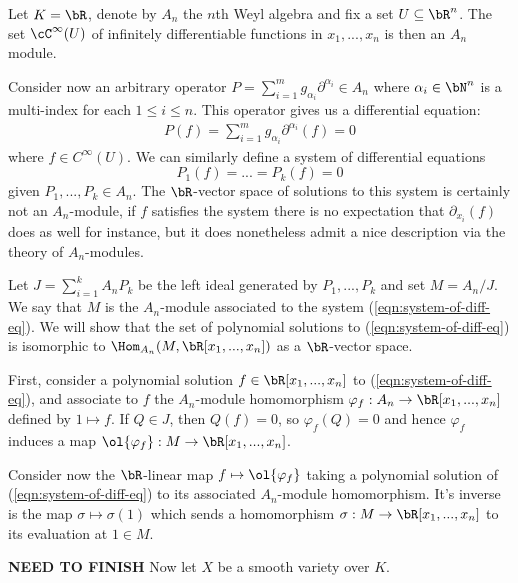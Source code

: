 \begin{example}\label{example:differential-equation}
	Let $K = \bR$, denote by $A_n$ the $n$th Weyl algebra and fix a set $U \subseteq \bR^n$. The set $\cC^\infty(U)$ of infinitely differentiable functions in $x_1,...,x_n$ is then an $A_n$ module.

	Consider now an arbitrary operator $P = \sum_{i=1}^m g_{\alpha_i} \partial^{\alpha_i} \in A_n$ where $\alpha_i \in \bN^n$ is a multi-index for each $1\leq i\leq n$. This operator gives us a differential equation:
	\begin{align*}
		P(f) = \sum_{i=1}^m g_{\alpha_i}\partial^{\alpha_i}(f) = 0
	\end{align*}
	where $f \in C^\infty(U)$. We can similarly define a system of differential equations
	\begin{equation}\label{eqn:system-of-diff-eq}
		P_1(f) = ... = P_k(f) = 0
	\end{equation}
	given $P_1,...,P_k \in A_n$. The $\bR$-vector space of solutions to this system is certainly not an $A_n$-module, if $f$ satisfies the system there is no expectation that $\partial_{x_i}(f)$ does as well for instance, but it does nonetheless admit a nice description via the theory of $A_n$-modules.

	Let $J = \sum_{i=1}^k A_nP_k$ be the left ideal generated by $P_1,...,P_k$ and set $M = A_n/J$. We say that $M$ is the $A_n$-module associated to the system (\ref{eqn:system-of-diff-eq}). We will show that the set of polynomial solutions to (\ref{eqn:system-of-diff-eq}) is isomorphic to $\Hom_{A_n}(M,\bR[x_1,...,x_n])$ as a $\bR$-vector space.

	First, consider a polynomial solution $f \in \bR[x_1,...,x_n]$ to (\ref{eqn:system-of-diff-eq}), and associate to $f$ the $A_n$-module homomorphism $\varphi_f:A_n\to \bR[x_1,...,x_n]$ defined by $1 \mapsto f$. If $Q \in J$, then $Q(f) = 0$, so $\varphi_f(Q) = 0$ and hence $\varphi_f$ induces a map $\ol{\varphi_f}:M\to\bR[x_1,...,x_n]$.

	Consider now the $\bR$-linear map $f\mapsto \ol{\varphi_f}$ taking a polynomial solution of (\ref{eqn:system-of-diff-eq}) to its associated $A_n$-module homomorphism. It's inverse is the map $\sigma \mapsto \sigma(1)$ which sends a homomorphism $\sigma:M\to \bR[x_1,...,x_n]$ to its evaluation at $1 \in M$.
\end{example}

\textbf{NEED TO FINISH}
Now let $X$ be a smooth variety over $K$.

